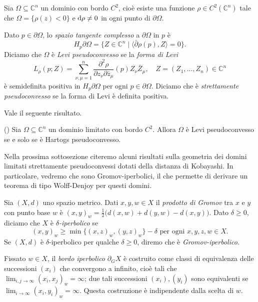 \begin{defn}
    Sia $\Omega \subseteq \mathbb{C}^n$ un dominio con bordo $C^2$, cioè esiste una funzione $\rho \in C^2(\mathbb{C}^n)$ tale che $\Omega=\{\rho(z)<0\}$ e $\mathop{}\!\mathrm{d}\rho\not=0$ in ogni punto di $\partial\Omega$.
    
    Dato $p \in \partial\Omega$, lo \textit{spazio tangente complesso} a $\partial\Omega$ in $p$ è
    \begin{equation}
        H_p\partial\Omega=\{Z \in \mathbb{C}^n \mid \langle \bar{\partial}\rho(p),Z\rangle=0\}.
    \end{equation}
    Diciamo che $\Omega$ è \textit{Levi pseudoconvesso} se la \textit{forma di Levi}
    \begin{equation}
        L_{\rho}(p;Z)=\sum_{\nu,\mu=1}^n \frac{\partial^2\rho}{\partial z_\nu\partial\bar{z}_\mu}(p)Z_\nu\bar{Z}_\mu, \quad Z=(Z_1,\dots,Z_n) \in \mathbb{C}^n
    \end{equation}
      è semidefinita positiva in $H_p\partial\Omega$ per ogni $p \in \partial\Omega$. Diciamo che è \textit{strettamente pseudoconvesso} se la forma di Levi è definita positiva.
\end{defn}

Vale il seguente risultato.
\begin{thm}
    (\cite[Chapter 3, Paragraph 3.3, Theorem 3.3.5]{Kr}) Sia $\Omega \subseteq \mathbb{C}^n$ un dominio limitato con bordo $C^2$. Allora $\Omega$ è Levi pseudoconvesso se e solo se è Hartogs pseudoconvesso.
\end{thm}

Nella prossima sottosezione citeremo alcuni risultati sulla geometria dei domini limitati strettamente pseudoconvessi dotati della distanza di Kobayashi. In particolare, vedremo che sono Gromov-iperbolici, il che permette di derivare un teorema di tipo Wolff-Denjoy per questi domini.

\begin{defn}
    Sia $(X,d)$ uno spazio metrico. Dati $x,y,w \in X$ il \textit{prodotto di Gromov} tra $x$ e $y$ con punto base $w$ è $(x,y)_w=\frac{1}{2}\big(d(x,w)+d(y,w)-d(x,y)\big)$. Dato $\delta \ge 0$, diciamo che $X$ è \textit{$\delta$-iperbolico} se
    $$(x,y)_w \ge \min\{(x,z)_w,(y,z)_w\}-\delta\text{ per ogni }x,y,z,w \in X.$$
    Se $(X,d)$ è $\delta$-iperbolico per qualche $\delta \ge 0$, diremo che è \textit{Gromov-iperbolico}.

    Fissato $w \in X$, il \textit{bordo iperbolico} $\partial_GX$ è costruito come classi di equivalenza delle successioni $(x_i)$ che convergono a infinito, cioè tali che $\displaystyle\lim_{i,j\rightarrow \infty}(x_i,x_j)_w=\infty$; due tali successioni $(x_i), (y_i)$ sono equivalenti se $\displaystyle\lim_{i\rightarrow \infty}(x_i,y_i)_w=\infty$. Questa costruzione è indipendente dalla scelta di $w$.
\end{defn}

